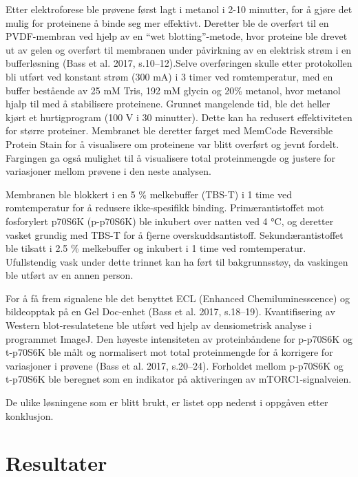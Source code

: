 \documentclass[
  letterpaper,
  DIV=11,
  numbers=noendperiod]{scrreprt}
\begin{document}
Etter elektroforese ble prøvene først lagt i metanol i 2-10 minutter,
for å gjøre det mulig for proteinene å binde seg mer effektivt. Deretter
ble de overført til en PVDF-membran ved hjelp av en ``wet
blotting''-metode, hvor proteine ble drevet ut av gelen og overført til
membranen under påvirkning av en elektrisk strøm i en bufferløsning
(Bass et al. 2017, s.10--12).Selve overføringen skulle etter protokollen
bli utført ved konstant strøm (300 mA) i 3 timer ved romtemperatur, med
en buffer bestående av 25 mM Tris, 192 mM glycin og 20\% metanol, hvor
metanol hjalp til med å stabilisere proteinene. Grunnet mangelende tid,
ble det heller kjørt et hurtigprogram (100 V i 30 minutter). Dette kan
ha redusert effektiviteten for større proteiner. Membranet ble deretter
farget med MemCode Reversible Protein Stain for å visualisere om
proteinene var blitt overført og jevnt fordelt. Fargingen ga også
mulighet til å visualisere total proteinmengde og justere for
variasjoner mellom prøvene i den neste analysen.

Membranen ble blokkert i en 5 \% melkebuffer (TBS-T) i 1 time ved
romtemperatur for å redusere ikke-spesifikk binding. Primærantistoffet
mot fosforylert p70S6K (p-p70S6K) ble inkubert over natten ved 4 °C, og
deretter vasket grundig med TBS-T for å fjerne overskuddsantistoff.
Sekundærantistoffet ble tilsatt i 2.5 \% melkebuffer og inkubert i 1
time ved romtemperatur. Ufullstendig vask under dette trinnet kan ha
ført til bakgrunnsstøy, da vaskingen ble utført av en annen person.

For å få frem signalene ble det benyttet ECL (Enhanced
Chemiluminesscence) og bildeopptak på en Gel Doc-enhet (Bass et al.
2017, s.18--19). Kvantifisering av Western blot-resulatetene ble utført
ved hjelp av densiometrisk analyse i programmet ImageJ. Den høyeste
intensiteten av proteinbåndene for p-p70S6K og t-p70S6K ble målt og
normalisert mot total proteinmengde for å korrigere for variasjoner i
prøvene (Bass et al. 2017, s.20--24). Forholdet mellom p-p70S6K og
t-p70S6K ble beregnet som en indikator på aktiveringen av
mTORC1-signalveien.

De ulike løsningene som er blitt brukt, er listet opp nederst i oppgåven
etter konklusjon.

\section{Resultater}\label{resultater-2}
\end{document}

